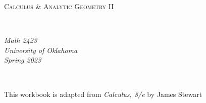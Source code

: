 \documentclass[notes]{subfiles}
\begin{document}
\rhead{}
\lhead{}
\chead{}
\thispagestyle{empty}
\[\]
\vspace{1in}
\begin{center}
	\begin{Huge}
		\textsc{Calculus \& Analytic Geometry II}
	\end{Huge}\\
		\vspace{2in}
	\begin{Large}
		\emph{Math 2423}\\
		\emph{University of Oklahoma}\\
		\emph{Spring 2023}
	\end{Large}\\
\end{center}
\vspace{2in}
\begin{center}
	This workbook is adapted from \emph{Calculus, 8/e} by James Stewart
\end{center}
\newpage
\thispagestyle{empty}
	\[\]
\end{document}
